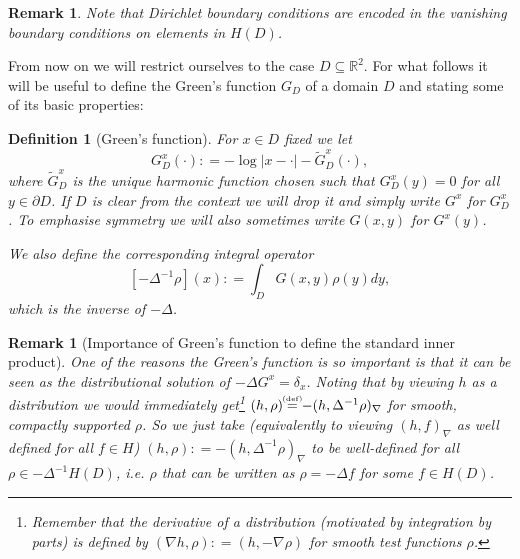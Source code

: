 \documentclass[11pt,reqno]{amsart}
\numberwithin{equation}{section}
\newtheorem{defi}[thm]{Definition}
\newtheorem{rem}[thm]{Remark}
\newcommand{\eqbydef}{\mathrel{\stackrel{\hspace*{-3mm}\text{\tiny(def)}\hspace*{-3mm}}{=}}}
\newcommand{\deq}{\mathrel{\mathop:}=}
\begin{document}
\begin{rem}
	Note that Dirichlet boundary conditions are encoded in the vanishing boundary conditions on elements in $H(D)$. %
\end{rem}

From now on we will restrict ourselves to the case $D\subseteq\mathbb R^2$. For what follows it will be useful to define the Green's function $G_D$ of a domain $D$ and stating some of its basic properties:

\begin{defi}[Green's function]
	For $x\in D$ fixed we let $$G_D^x(\cdot)\deq -\log|x-\cdot|-\tilde G_D^x(\cdot),$$ where $\tilde G_D^x$ is the unique harmonic function chosen such that $G_D^x(y)=0$ for all $y\in\partial D$.
	If $D$ is clear from the context we will drop it and simply write $G^x$ for $G^x_D$.
	To emphasise symmetry we will also sometimes write $G(x,y)$ for $G^x(y)$.
	
	We also define the corresponding integral operator $$[-\Delta^{-1}\rho](x)\deq\int_D G(x,y)\rho(y)dy,$$ which is the inverse of $-\Delta$.
\end{defi}

\begin{rem}[Importance of Green's function to define the standard inner product]\label{rem:usesofGreensfct}
	One of the reasons the Green's function is so important is that it can be seen as the distributional solution of $-\Delta G^x = \delta_x$. 
	Noting that by viewing $h$ as a distribution we would immediately get\footnote{Remember that the derivative of a distribution (motivated by integration by parts) is defined by $(\nabla h,\rho)\deq(h,-\nabla\rho)$ for smooth test functions $\rho$.} $(h,\rho)\eqbydef -(h,\Delta^{-1}\rho)_\nabla$ for smooth, compactly supported $\rho$. So we just take (equivalently to viewing $(h,f)_\nabla$ as well defined for all $f\in H$) $(h,\rho)\deq -(h,\Delta^{-1}\rho)_\nabla$ to be well-defined for all $\rho\in -\Delta^{-1}H(D)$, i.e. $\rho$ that can be written as $\rho = -\Delta f$ for some $f\in H(D)$.
\end{rem}
\end{document}
